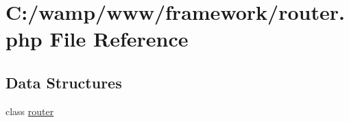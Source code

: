 \hypertarget{router_8php}{
\section{C:/wamp/www/framework/router.php File Reference}
\label{router_8php}
}
\subsection*{Data Structures}
\begin{DoxyCompactItemize}
\item 
class \hyperlink{classrouter}{router}
\end{DoxyCompactItemize}
